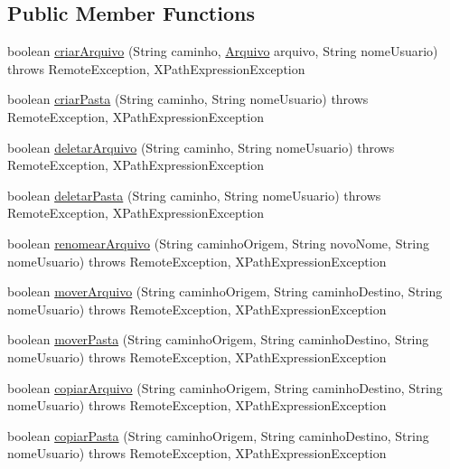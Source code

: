 \subsection*{Public Member Functions}
\begin{DoxyCompactItemize}
\item 
boolean \hyperlink{interfaceservidor_1_1_sistema_arquivo_interface_a8668540815b2886b3816ac23e3e24740}{criar\+Arquivo} (String caminho, \hyperlink{classmodel_1_1_arquivo}{Arquivo} arquivo, String nome\+Usuario)  throws Remote\+Exception, X\+Path\+Expression\+Exception
\item 
boolean \hyperlink{interfaceservidor_1_1_sistema_arquivo_interface_a46a7a411f21d0db4cad12e07425a2259}{criar\+Pasta} (String caminho, String nome\+Usuario)  throws Remote\+Exception, X\+Path\+Expression\+Exception
\item 
boolean \hyperlink{interfaceservidor_1_1_sistema_arquivo_interface_afb7dfa9a67c813d586d9fbce4fb9e001}{deletar\+Arquivo} (String caminho, String nome\+Usuario)  throws Remote\+Exception, X\+Path\+Expression\+Exception
\item 
boolean \hyperlink{interfaceservidor_1_1_sistema_arquivo_interface_ad24ed755bdc26c9e6bcfab426d3649aa}{deletar\+Pasta} (String caminho, String nome\+Usuario)  throws Remote\+Exception, X\+Path\+Expression\+Exception
\item 
boolean \hyperlink{interfaceservidor_1_1_sistema_arquivo_interface_a38ac4858f2f0e0743dea54983b24b860}{renomear\+Arquivo} (String caminho\+Origem, String novo\+Nome, String nome\+Usuario)  throws Remote\+Exception, X\+Path\+Expression\+Exception
\item 
boolean \hyperlink{interfaceservidor_1_1_sistema_arquivo_interface_a187abef3707033620038ceaf7bf61862}{mover\+Arquivo} (String caminho\+Origem, String caminho\+Destino, String nome\+Usuario)  throws Remote\+Exception, X\+Path\+Expression\+Exception
\item 
boolean \hyperlink{interfaceservidor_1_1_sistema_arquivo_interface_a5cb77a26cf0c6ec0868473aca67b15ca}{mover\+Pasta} (String caminho\+Origem, String caminho\+Destino, String nome\+Usuario)  throws Remote\+Exception, X\+Path\+Expression\+Exception
\item 
boolean \hyperlink{interfaceservidor_1_1_sistema_arquivo_interface_a386c5f49538f37522be89af4ca35d245}{copiar\+Arquivo} (String caminho\+Origem, String caminho\+Destino, String nome\+Usuario)  throws Remote\+Exception, X\+Path\+Expression\+Exception
\item 
boolean \hyperlink{interfaceservidor_1_1_sistema_arquivo_interface_ab7818dbb84f0d389cfbf10f0f0bb9580}{copiar\+Pasta} (String caminho\+Origem, String caminho\+Destino, String nome\+Usuario)  throws Remote\+Exception, X\+Path\+Expression\+Exception

\end{DoxyCompactItemize}
